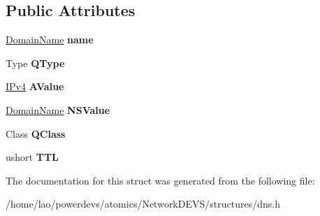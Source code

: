 \subsection*{Public Attributes}
\begin{DoxyCompactItemize}
\item 
\hyperlink{structdns_1_1DomainName}{Domain\+Name} {\bfseries name}\hypertarget{structdns_1_1ResourceRecord_ad0df62525540c1e2a9dcfc6b08e938bc}{}\label{structdns_1_1ResourceRecord_ad0df62525540c1e2a9dcfc6b08e938bc}

\item 
Type {\bfseries Q\+Type}\hypertarget{structdns_1_1ResourceRecord_a16b19c9f45bfd089ef50089eda442076}{}\label{structdns_1_1ResourceRecord_a16b19c9f45bfd089ef50089eda442076}

\item 
\hyperlink{structIPv4}{I\+Pv4} {\bfseries A\+Value}\hypertarget{structdns_1_1ResourceRecord_a1c93ffe71aba5a8893f38a08fdec766f}{}\label{structdns_1_1ResourceRecord_a1c93ffe71aba5a8893f38a08fdec766f}

\item 
\hyperlink{structdns_1_1DomainName}{Domain\+Name} {\bfseries N\+S\+Value}\hypertarget{structdns_1_1ResourceRecord_a66c5d870f1a6328e6e1c26845102be6a}{}\label{structdns_1_1ResourceRecord_a66c5d870f1a6328e6e1c26845102be6a}

\item 
Class {\bfseries Q\+Class}\hypertarget{structdns_1_1ResourceRecord_a08dc70151680f4d765e9ce3896352154}{}\label{structdns_1_1ResourceRecord_a08dc70151680f4d765e9ce3896352154}

\item 
ushort {\bfseries T\+TL}\hypertarget{structdns_1_1ResourceRecord_a7c540bed9cace85ce331bf596a6827e4}{}\label{structdns_1_1ResourceRecord_a7c540bed9cace85ce331bf596a6827e4}

\end{DoxyCompactItemize}


The documentation for this struct was generated from the following file\+:\begin{DoxyCompactItemize}
\item 
/home/lao/powerdevs/atomics/\+Network\+D\+E\+V\+S/structures/dns.\+h\end{DoxyCompactItemize}
